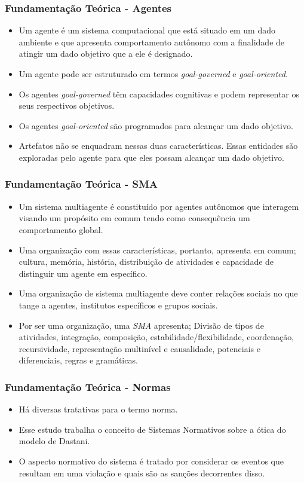 \documentclass{beamer}
\begin{document}
\begin{frame}
\frametitle{Fundamentação Teórica - Agentes}
	\begin{itemize}
		\item Um agente é um sistema computacional que está situado em um dado ambiente e que apresenta comportamento autônomo com a finalidade de atingir um dado objetivo que a ele é designado. 
		\item Um agente pode ser estruturado em termos \textit{goal-governed} e \textit{goal-oriented}.
		\item Os agentes \textit{goal-governed} têm capacidades cognitivas e podem representar os seus respectivos objetivos. 
		\item Os agentes \textit{goal-oriented} são programados para alcançar um dado objetivo. 
		\item Artefatos não se enquadram nessas duas características. Essas entidades são exploradas pelo agente para que eles possam alcançar um dado objetivo. 
	\end{itemize}
\end{frame}

\begin{frame}
\frametitle{Fundamentação Teórica - SMA}
	\begin{itemize}
		\item Um sistema multiagente é constituído por agentes autônomos que interagem visando um propósito em comum tendo como consequência um comportamento global. 
		\item Uma organização com essas características, portanto, apresenta em comum; cultura, memória, história, distribuição de atividades e capacidade de distinguir um agente em específico. 
		\item Uma organização de sistema multiagente deve conter relações sociais no que tange a agentes, institutos específicos e grupos sociais. 
		\item Por ser uma organização, uma \textit{SMA} apresenta; Divisão de tipos de atividades, integração, composição, estabilidade/flexibilidade, coordenação, recursividade, representação multinível e causalidade, potenciais e diferenciais, regras e gramáticas.
	\end{itemize}
\end{frame}

\begin{frame}
	\frametitle{Fundamentação Teórica - Normas}
	\begin{itemize}
		\item Há diversas tratativas para o termo norma.
		\item Esse estudo trabalha o conceito de Sistemas Normativos sobre a ótica do modelo de Dastani.
		\item O aspecto normativo do sistema é tratado por considerar os eventos que resultam em uma violação e quais são as sanções decorrentes disso.
	\end{itemize}
\end{frame}
\end{document}
